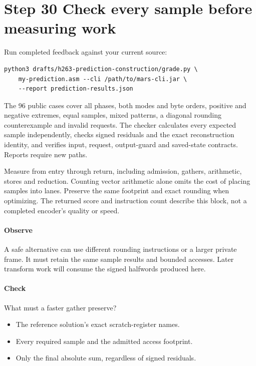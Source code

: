 \section{Step 30 Check every sample before measuring work}\label{h263-prediction-s10}
Run completed feedback against your current source:
\begin{verbatim}
python3 drafts/h263-prediction-construction/grade.py \
    my-prediction.asm --cli /path/to/mars-cli.jar \
    --report prediction-results.json
\end{verbatim}
The 96 public cases cover all phases, both modes and byte orders, positive and
negative extremes, equal samples, mixed patterns, a diagonal rounding counterexample
and invalid requests. The checker calculates every expected sample independently,
checks signed residuals and the exact reconstruction identity, and verifies input,
request, output-guard and saved-state contracts. Reports require new paths.

Measure from entry through return, including admission, gathers, arithmetic,
stores and reduction. Counting vector arithmetic alone omits the cost of placing
samples into lanes. Preserve the same footprint and exact rounding when optimizing.
The returned score and instruction count describe this block, not a completed
encoder's quality or speed.

\paragraph{Observe} A safe alternative can use different rounding instructions
or a larger private frame. It must retain the same sample results and bounded
accesses. Later transform work will consume the signed halfwords produced here.
\Needspace{8\baselineskip}
\paragraph{Check} What must a faster gather preserve?
\begin{itemize}
  \item[A.] The reference solution's exact scratch-register names.
  \item[B.] Every required sample and the admitted access footprint.
  \item[C.] Only the final absolute sum, regardless of signed residuals.
\end{itemize}
